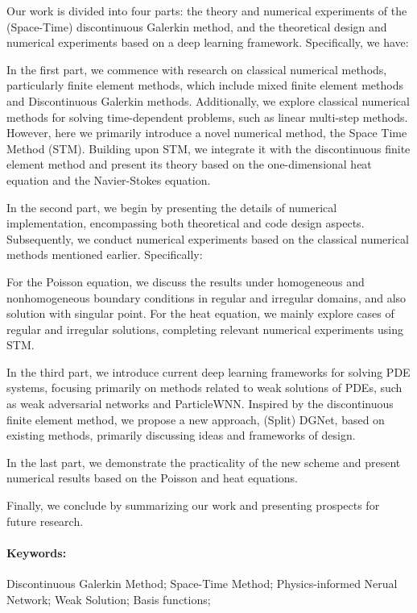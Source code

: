 Our work is divided into four parts: the theory and numerical experiments of the (Space-Time) discontinuous Galerkin method, and the theoretical design and numerical experiments based on a deep learning framework. Specifically, we have:

In the first part, we commence with research on classical numerical methods, particularly finite element methods, which include mixed finite element methods and Discontinuous Galerkin methods. Additionally, we explore classical numerical methods for solving time-dependent problems, such as linear multi-step methods. 
However, here we primarily introduce a novel numerical method, the Space Time Method (STM). Building upon STM, we integrate it with the discontinuous finite element method and present its theory based on the one-dimensional heat equation and the Navier-Stokes equation.

In the second part, we begin by presenting the details of numerical implementation, encompassing both theoretical and code design aspects. Subsequently, we conduct numerical experiments based on the classical numerical methods mentioned earlier. Specifically:

For the Poisson equation, we discuss the results under homogeneous and nonhomogeneous boundary conditions in regular and irregular domains, and also solution with singular point.
For the heat equation, we mainly explore cases of regular and irregular solutions, completing relevant numerical experiments using STM.

In the third part, we introduce current deep learning frameworks for solving PDE systems, focusing primarily on methods related to weak solutions of PDEs, such as weak adversarial networks and ParticleWNN. 
Inspired by the discontinuous finite element method, we propose a new approach, (Split) DGNet, based on existing methods, primarily discussing ideas and frameworks of design.

In the last part, we demonstrate the practicality of the new scheme and present numerical results based on the Poisson and heat equations.


\cleardoublepage{}
Finally, we conclude by summarizing our work and presenting prospects for future research.

\paragraph*{Keywords:} Discontinuous Galerkin Method; Space-Time Method; Physics-informed Nerual Network; Weak Solution; Basis functions;